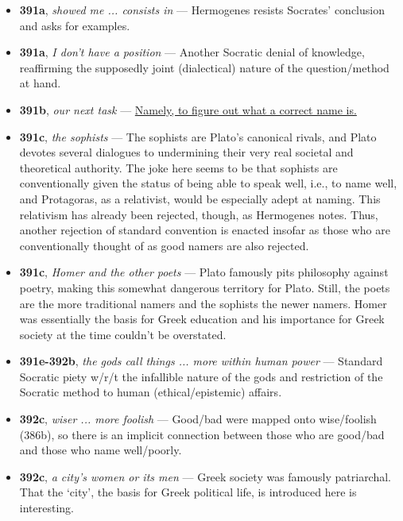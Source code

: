 \documentclass[12pt]{article}
\begin{document}
\begin{itemize}

\item \textbf{391a}, \textit{showed me ... consists in} --- Hermogenes resists Socrates' conclusion and asks for examples.

\item \textbf{391a}, \textit{I don't have a position} --- Another Socratic denial of knowledge, reaffirming the supposedly joint (dialectical) nature of the question/method at hand.

\item \textbf{391b}, \textit{our next task} --- \ul{Namely, to figure out what a correct name is.}

\item \textbf{391c}, \textit{the sophists} --- The sophists are Plato's canonical rivals, and Plato devotes several dialogues to undermining their very real societal and theoretical authority. The joke here seems to be that sophists are conventionally given the status of being able to speak well, i.e., to name well, and Protagoras, as a relativist, would be especially adept at naming. This relativism has already been rejected, though, as Hermogenes notes. Thus, another rejection of standard convention is enacted insofar as those who are conventionally thought of as good namers are also rejected.

\item \textbf{391c}, \textit{Homer and the other poets} --- Plato famously pits philosophy against poetry, making this somewhat dangerous territory for Plato. Still, the poets are the more traditional namers and the sophists the newer namers. Homer was essentially the basis for Greek education and his importance for Greek society at the time couldn't be overstated.

\item \textbf{391e-392b}, \textit{the gods call things ... more within human power} --- Standard Socratic piety w/r/t the infallible nature of the gods and restriction of the Socratic method to human (ethical/epistemic) affairs.

\item \textbf{392c}, \textit{wiser ... more foolish} --- Good/bad were mapped onto wise/foolish (386b), so there is an implicit connection between those who are good/bad and those who name well/poorly.

\item \textbf{392c}, \textit{a city's women or its men} --- Greek society was famously patriarchal. That the `city', the basis for Greek political life, is introduced here is interesting.


\end{itemize}
\end{document}
